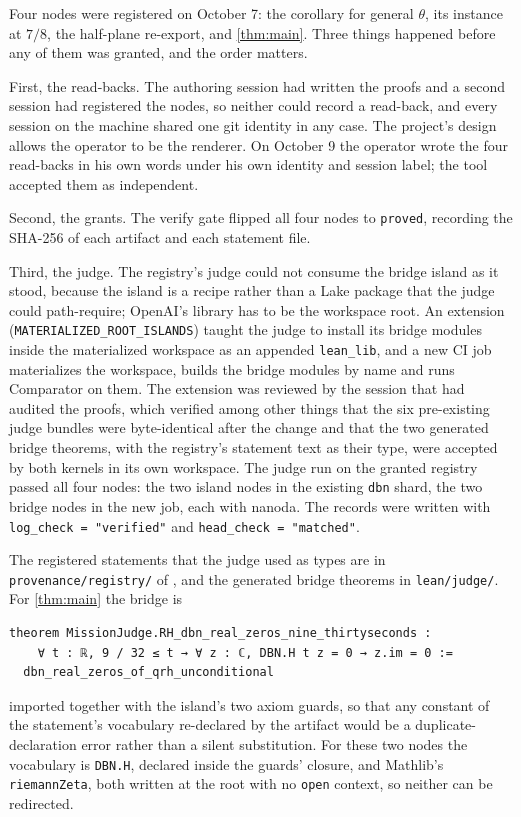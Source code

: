 \documentclass[11pt]{article}
\theoremstyle{definition}
\newcommand{\lean}[1]{\texttt{#1}}
\begin{document}
Four nodes were registered on October 7: the corollary for general $\theta$, its instance at $7/8$, the half-plane re-export, and \cref{thm:main}. Three things happened before any of them was granted, and the order matters.

First, the read-backs. The authoring session had written the proofs and a second session had registered the nodes, so neither could record a read-back, and every session on the machine shared one git identity in any case. The project's design allows the operator to be the renderer. On October 9 the operator wrote the four read-backs in his own words under his own identity and session label; the tool accepted them as independent.

Second, the grants. The verify gate flipped all four nodes to \lean{proved}, recording the SHA-256 of each artifact and each statement file.

Third, the judge. The registry's judge could not consume the bridge island as it stood, because the island is a recipe rather than a Lake package that the judge could path-require; OpenAI's library has to be the workspace root. An extension (\lean{MATERIALIZED\_ROOT\_ISLANDS}) taught the judge to install its bridge modules inside the materialized workspace as an appended \lean{lean\_lib}, and a new CI job materializes the workspace, builds the bridge modules by name and runs Comparator on them. The extension was reviewed by the session that had audited the proofs, which verified among other things that the six pre-existing judge bundles were byte-identical after the change and that the two generated bridge theorems, with the registry's statement text as their type, were accepted by both kernels in its own workspace. The judge run on the granted registry passed all four nodes: the two island nodes in the existing \lean{dbn} shard, the two bridge nodes in the new job, each with nanoda. The records were written with \lean{log\_check = "verified"} and \lean{head\_check = "matched"}.

The registered statements that the judge used as types are in \lean{provenance/registry/} of \cite{Repo}, and the generated bridge theorems in \lean{lean/judge/}. For \cref{thm:main} the bridge is
\begin{lstlisting}
theorem MissionJudge.RH_dbn_real_zeros_nine_thirtyseconds :
    ∀ t : ℝ, 9 / 32 ≤ t → ∀ z : ℂ, DBN.H t z = 0 → z.im = 0 :=
  dbn_real_zeros_of_qrh_unconditional
\end{lstlisting}
imported together with the island's two axiom guards, so that any constant of the statement's vocabulary re-declared by the artifact would be a duplicate-declaration error rather than a silent substitution. For these two nodes the vocabulary is \lean{DBN.H}, declared inside the guards' closure, and Mathlib's \lean{riemannZeta}, both written at the root with no \lean{open} context, so neither can be redirected.
\end{document}
